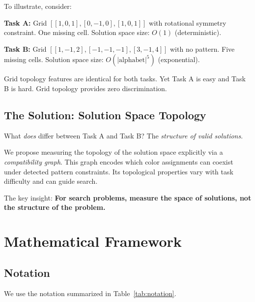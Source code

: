 \documentclass[11pt]{article}
\begin{document}
To illustrate, consider:

\textbf{Task A:} Grid $[[1, 0, 1], [0, -1, 0], [1, 0, 1]]$ with rotational symmetry constraint. One missing cell. Solution space size: $O(1)$ (deterministic).

\textbf{Task B:} Grid $[[1, -1, 2], [-1, -1, -1], [3, -1, 4]]$ with no pattern. Five missing cells. Solution space size: $O(|\text{alphabet}|^5)$ (exponential).

Grid topology features are identical for both tasks. Yet Task A is easy and Task B is hard. Grid topology provides zero discrimination.

\subsection{The Solution: Solution Space Topology}

What \emph{does} differ between Task A and Task B? The \emph{structure of valid solutions}.

We propose measuring the topology of the solution space explicitly via a \emph{compatibility graph}. This graph encodes which color assignments can coexist under detected pattern constraints. Its topological properties vary with task difficulty and can guide search.

The key insight: \textbf{For search problems, measure the space of solutions, not the structure of the problem.}

\section{Mathematical Framework}

\subsection{Notation}

We use the notation summarized in Table~\ref{tab:notation}.
\end{document}
